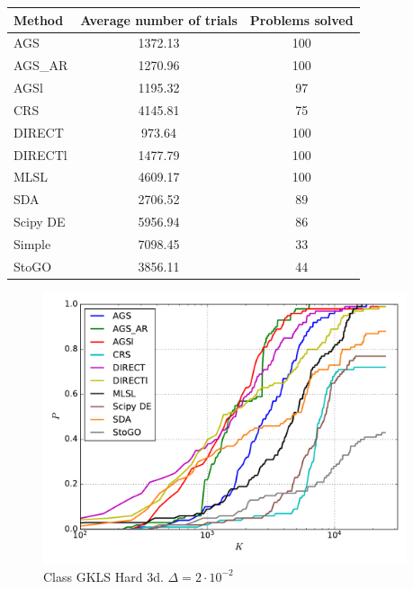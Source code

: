 \documentclass[a4paper]{article}
\begin{document}
\begin{tabular}{lcc}
\hline
 Method   &  Average number of trials  &  Problems solved  \\
\hline
 AGS      &          1372.13           &        100        \\
 AGS\_AR   &          1270.96           &        100        \\
 AGSl     &          1195.32           &        97         \\
 CRS      &          4145.81           &        75         \\
 DIRECT   &           973.64           &        100        \\
 DIRECTl  &          1477.79           &        100        \\
 MLSL     &          4609.17           &        100        \\
 SDA      &          2706.52           &        89         \\
 Scipy DE &          5956.94           &        86         \\
 Simple   &          7098.45           &        33         \\
 StoGO    &          3856.11           &        44         \\
\hline
\end{tabular}
\begin{figure}[H]
  \center
  \includegraphics[width=0.95\textwidth]{../experiments/gklsh3d/cmc.pdf}
  \caption{Class GKLS Hard 3d. $\Delta=2\cdot10^{-2}$}
\end{figure}
\end{document}
